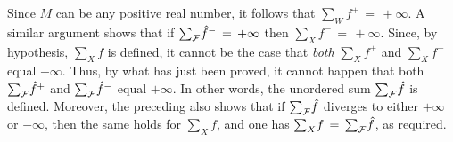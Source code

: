     Since $M$ can be any positive real number, it follows that ${\sum}_{W} f^{+} \,=\, +{\infty}$.
    A similar argument shows that if ${\sum}_{{\cal F}} \hat{f}^{-} \,=\, +{\infty}$ then ${\sum}_{X} f^{-} \,=\, +{\infty}$.
    Since, by hypothesis, ${\sum}_{X} f$ is defined, it cannot be the case that {\em both} ${\sum}_{X} f^{+}$ and ${\sum}_{X} f^{-}$ equal $+{\infty}$.
    Thus, by what has just been  proved, it cannot happen that both ${\sum}_{{\cal F}} \hat{f}^{+}$ and ${\sum}_{{\cal F}} \hat{f}^{-}$ equal $+{\infty}$.
    In other words, the unordered sum ${\sum}_{{\cal F}} \hat{f}$ is defined.
    Moreover, the preceding also shows that if ${\sum}_{{\cal F}} \hat{f}$  diverges to either $+{\infty}$ or $-{\infty}$,
    then the same holds for ${\sum}_{X} f$, and one has ${\sum}_{X} f \,=\, {\sum}_{{\cal F}} \hat{f}$, as required.

